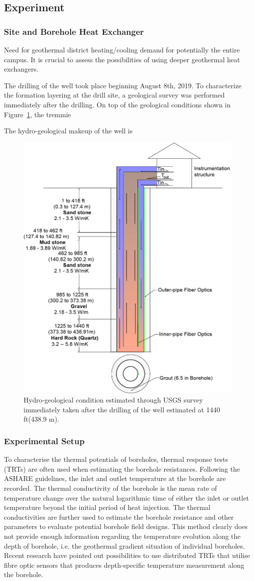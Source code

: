 \subsection{Experiment}

\subsubsection{Site and Borehole Heat Exchanger}
	Need for geothermal district heating/cooling demand for potentially the entire campus. It is crucial to assess the possibilities of using deeper geothermal heat exchangers. 
	
	The drilling of the well took place beginning August 8th, 2019. To characterize the formation layering at the drill site, a geological survey was performed immediately after the drilling. On top of the geological conditions shown in Figure~\ref{fg:hydro}, the tremmie 
	
	The hydro-geological makeup of the well is 
	\begin{figure}
	\centering
	\includegraphics[height=0.5\textwidth]{data/geology_cbhe.png}
	\caption{Hydro-geological condition estimated through USGS survey immediately taken after the drilling of the well estimated at 1440 ft(438.9 m).}\label{fg:hydro}	
	\end{figure}
	
\subsubsection{Experimental Setup}
	To characterise the thermal potentials of boreholes, thermal response tests (TRTs) are often used when estimating the borehole resistances. Following the ASHARE guidelines, the inlet and outlet temperature at the borehole are recorded. The thermal conductivity of the borehole is the mean rate of temperature change over the natural logarithmic time of either the inlet or outlet temperature beyond the initial period of heat injection. The thermal conductivities are further used to estimate the borehole resistance and other parameters to evaluate potential borehole field designs. This method clearly does not provide enough information regarding the temperature evolution along the depth of borehole, i.e. the geothermal gradient situation of individual boreholes. Recent research have pointed out possibilities to use distributed TRTs that utilise fibre optic sensors that produces depth-specific temperature measurement along the borehole.  
	
